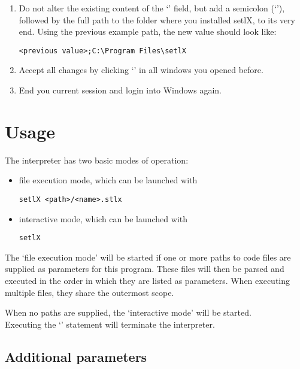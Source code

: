 \begin{enumerate}
\begin{enumerate}
		\item Do not alter the existing content of the `' field, but add a semicolon (`\command{;}'), followed by the full path to the folder where you installed setlX, to its very end. Using the previous example path, the new value should look like:
\begin{lstlisting}[frame=none,numbers=none]
<previous value>;C:\Program Files\setlX
\end{lstlisting}
		\item Accept all changes by clicking `' in all windows you opened before.
		\item End you current session and login into Windows again.
	\end{enumerate}
\end{enumerate}

\newpage

\section{Usage}

The \setlX{} interpreter has two basic modes of operation:

\begin{itemize}
	\item file execution mode, which can be launched with
\begin{lstlisting}[frame=none,numbers=none]
setlX <path>/<name>.stlx
\end{lstlisting}
	\item interactive mode, which can be launched with
\begin{lstlisting}[frame=none,numbers=none]
setlX
\end{lstlisting}
\end{itemize}

The `file execution mode' will be started if one or more paths to code files are supplied as parameters for this program. These files will then be parsed and executed in the order in which they are listed as parameters. When executing multiple files, they share the outermost scope.

When no paths are supplied, the `interactive mode' will be started.\\
Executing the `' statement will terminate the interpreter.

\subsection*{Additional parameters}

